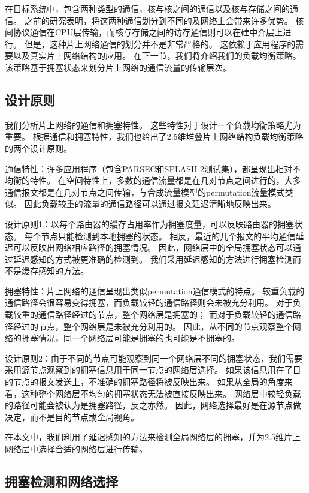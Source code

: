 在目标系统中，包含两种类型的通信，核与核之间的通信以及核与存储之间的通信。
之前的研究表明，将这两种通信划分到不同的及网络上会带来许多优势。
核间协议通信在CPU层传输，而核与存储之间的访存通信则可以在硅中介层上进行。
但是，这种片上网络通信的划分并不是非常严格的。
这依赖于应用程序的需要以及真实片上网络结构的应用。
在下一节，我们将介绍我们的负载均衡策略。
该策略基于拥塞状态来划分片上网络的通信流量的传输层次。


\subsection{设计原则}

我们分析片上网络的通信和拥塞特性。
这些特性对于设计一个负载均衡策略尤为重要。
根据通信和拥塞特性，我们也给出了2.5维堆叠片上网络结构负载均衡策略的两个设计原则。

通信特性：许多应用程序（包含PARSEC和SPLASH-2测试集），都呈现出相对不均衡的特性。
在空间特性上，多数的通信流量都是在几对节点之间进行的，大多通信报文都是在几对节点之间传输，与合成流量模型的permutation流量模式类似。
因此负载较重的流量的通信路径可以通过报文延迟清晰地反映出来。

设计原则1：以每个路由器的缓存占用率作为拥塞度量，可以反映路由器的拥塞状态。
每个节点只能检测到本地拥塞的状态。
相反，最近的几个报文的平均通信延迟可以反映出网络相应路径的拥塞情况。
因此，网络层中的全局拥塞状态可以通过延迟感知的方式被更准确的检测到。
我们采用延迟感知的方法进行拥塞检测而不是缓存感知的方法。

拥塞特性：片上网络的通信呈现出类似permutation通信模式的特点。
较重负载的通信路径会很容易变得拥塞，而负载较轻的通信路径则会未被充分利用。
对于负载较重的通信路径经过的节点，整个网络层是拥塞的；
而对于负载较轻的通信路径经过的节点，整个网络层是未被充分利用的。
因此，从不同的节点观察整个网络的拥塞情况，同一个网络层可能是拥塞的也可能是不拥塞的。

设计原则2：由于不同的节点可能观察到同一个网络层不同的拥塞状态，我们需要采用源节点观察到的拥塞信息用于同一节点的网络层选择。
如果该信息用在了目的节点的报文发送上，不准确的拥塞路径将被反映出来。
如果从全局的角度来看，这种整个网络层不均匀的拥塞状态无法被直接反映出来。
网络层中较轻负载的路径可能会被认为是拥塞路径，反之亦然。
因此，网络选择最好是在源节点做决定，而不是目的节点或全局视角。

在本文中，我们利用了延迟感知的方法来检测全局网络层的拥塞，并为2.5维片上网络层中选择合适的网络层进行传输。

\subsection{拥塞检测和网络选择}

